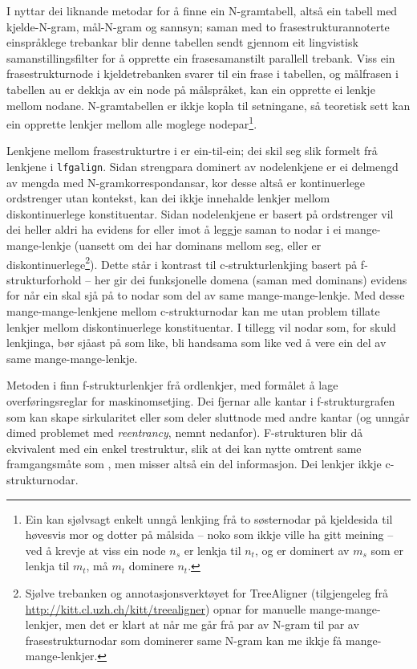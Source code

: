 \documentclass[11pt,a4paper,oneside,draft]{book}
\begin{document}
 I \citet{samuelsson2007apa} nyttar dei liknande metodar for å finne
 ein N-gramtabell, altså ein tabell med kjelde-N-gram, mål-N-gram og
 sannsyn; saman med to frasestrukturannoterte einspråklege trebankar
 blir denne tabellen sendt gjennom eit lingvistisk
 samanstillingsfilter for å opprette ein frasesamanstilt parallell
 trebank. Viss ein frasestrukturnode i kjeldetrebanken svarer til ein
 frase i tabellen, og målfrasen i tabellen au er dekkja av ein node på
 målspråket, kan ein opprette ei lenkje mellom nodane.  N-gramtabellen
 er ikkje kopla til setningane, så teoretisk sett kan ein opprette
 lenkjer mellom alle moglege nodepar\footnote{Ein kan sjølvsagt enkelt unngå lenkjing frå to søsternodar på
        kjeldesida til høvesvis mor og dotter på målsida -- noko som
        ikkje ville ha gitt meining -- ved å krevje at viss ein node
        $n_s$ er lenkja til $n_t$, og er dominert av $m_s$ som er
        lenkja til $m_t$, må $m_t$ dominere $n_t$. }. 

 Lenkjene mellom frasestrukturtre i \citet{samuelsson2007apa} er
 ein-til-ein; dei skil seg slik formelt frå lenkjene i
 \texttt{lfgalign}. Sidan strengpara dominert av nodelenkjene er ei delmengd
 av mengda med N-gramkorrespondansar, kor desse altså er kontinuerlege
 ordstrenger utan kontekst, kan dei ikkje innehalde lenkjer mellom
 diskontinuerlege konstituentar. Sidan nodelenkjene er basert på
 ordstrenger vil dei heller aldri ha evidens for eller imot å leggje
 saman to nodar i ei mange-mange-lenkje (uansett om dei har dominans
 mellom seg, eller er diskontinuerlege\footnote{Sjølve trebanken \citep{samuelsson2006pap} og
        annotasjonsverktøyet for TreeAligner (tilgjengeleg frå
        \href{http://kitt.cl.uzh.ch/kitt/treealigner}{http://kitt.cl.uzh.ch/kitt/treealigner}) opnar for manuelle
        mange-mange-lenkjer, men det er klart at når me går frå par av
        N-gram til par av frasestrukturnodar som dominerer same N-gram
        kan me ikkje få mange-mange-lenkjer. }). Dette står i kontrast
 til c-strukturlenkjing basert på f-strukturforhold -- her gir dei
 funksjonelle domena (saman med dominans) evidens for når ein skal sjå
 på to nodar som del av same mange-mange-lenkje.  Med desse
 mange-mange-lenkjene mellom c-strukturnodar kan me utan problem
 tillate lenkjer mellom diskontinuerlege konstituentar. I tillegg vil
 nodar som, for skuld lenkjinga, bør sjåast på som like, bli handsama
 som like ved å vere ein del av same mange-mange-lenkje.
 
 Metoden i \citet{graham2009osr} finn f-strukturlenkjer frå
 ordlenkjer, med formålet å lage overføringsreglar for
 maskinomsetjing. Dei fjernar alle kantar i f-strukturgrafen som kan
 skape sirkularitet eller som deler sluttnode med andre kantar (og
 unngår dimed problemet med \emph{reentrancy}, nemnt
 nedanfor). F-strukturen blir då ekvivalent med ein enkel trestruktur,
 slik at dei kan nytte omtrent same framgangsmåte som
 \citet{samuelsson2007apa}, men misser altså ein del informasjon. Dei
 lenkjer ikkje c-strukturnodar.
\end{document}
